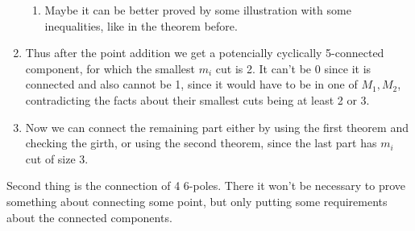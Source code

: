 \documentclass[12pt, twoside]{book}
\begin{document}
\begin{enumerate}
\begin{enumerate}
		\item Maybe it can be better proved by some illustration with some inequalities, like in the theorem before.
	\end{enumerate}
	\item Thus after the point addition we get a potencially cyclically 5-connected component, for which the smallest $m_i$ cut is 2. It can't be 0 since it is connected and also cannot be 1, since it would have to be in one of $M_1,M_2$, contradicting the facts about their smallest cuts being at least 2 or 3.
	\item Now we can connect the remaining part either by using the first theorem and checking the girth, or using the second theorem, since the last part has $m_i$ cut of size 3.
\end{enumerate}

Second thing is the connection of 4 6-poles. There it won't be necessary to prove something about connecting some point, but only putting some requirements about the connected components. \todo{}

\newpage
\thispagestyle{empty}




\end{document}
